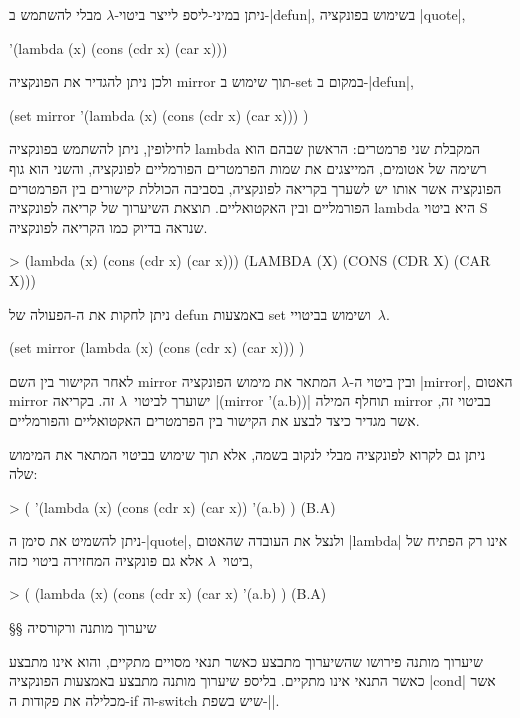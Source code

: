 ניתן במיני-ליספ לייצר ביטוי-$λ$ מבלי להשתמש ב-\E|defun|, בשימוש בפונקציה
\E|quote|,
\begin{LISP}
  '(lambda (x) (cons (cdr x) (car x)))
\end{LISP}
ולכן ניתן להגדיר את הפונקציה mirror תוך שימוש ב-set במקום ב-\E|defun|,
\begin{LISP}
(set mirror
  '(lambda (x)
      (cons (cdr x) (car x)))
)
\end{LISP}
לחילופין, ניתן להשתמש בפונקציה lambda המקבלת שני פרמטרים: הראשון שבהם הוא רשימה
של אטומים, המייצגים את שמות הפרמטרים הפורמליים לפונקציה, והשני הוא גוף הפונקציה
אשר אותו יש לשערך בקריאה לפונקציה, בסביבה הכוללת קישורים בין הפרמטרים הפורמליים
ובין האקטואליים. תוצאת השיערוך של קריאה לפונקציה lambda היא ביטוי S שנראה
בדיוק כמו הקריאה לפונקציה.
\begin{LISP}
> (lambda (x) (cons (cdr x) (car x)))
(LAMBDA (X) (CONS (CDR X) (CAR X)))
\end{LISP}
ניתן לחקות את ה-הפעולה של defun באמצעות set ושימוש בביטויי~$λ$.
\begin{LISP}
(set
  mirror
  (lambda (x) (cons (cdr x) (car x)))
)
\end{LISP}
לאחר הקישור בין השם mirror ובין ביטוי ה-$λ$ המתאר את מימוש הפונקציה \E|mirror|,
האטום mirror ישוערך לביטוי~$λ$ זה. בקריאה \T|(mirror '(a.b))| תוחלף המילה
mirror בביטוי זה, אשר מגדיר כיצד לבצע את הקישור בין הפרמטרים האקטואליים
והפורמליים.

ניתן גם לקרוא לפונקציה מבלי לנקוב בשמה, אלא תוך שימוש בביטוי המתאר את המימוש
שלה:
\pagebreak[3]
\begin{LISP}
> (
    '(lambda (x)
      (cons (cdr x) (car x))
    '(a.b)
)
(B.A)
\end{LISP}
ניתן להשמיט את סימן ה-\E|quote|, ולנצל את העובדה שהאטום \T|lambda| אינו רק
הפתיח של ביטוי~$λ$ אלא גם פונקציה המחזירה ביטוי כזה,
\begin{LISP}
> (
    (lambda (x) (cons (cdr x) (car x)
    '(a.b)
)
(B.A)
\end{LISP}

§§ שיערוך מותנה ורקורסיה

שיערוך מותנה פירושו שהשיערוך מתבצע כאשר תנאי מסויים מתקיים, והוא אינו מתבצע
כאשר התנאי אינו מתקיים. בליספ שיערוך מותנה מתבצע באמצעות הפונקציה \E|cond|
אשר מכלילה את פקודות ה-if וה-switch שיש בשפת-\E|\CPL|.

